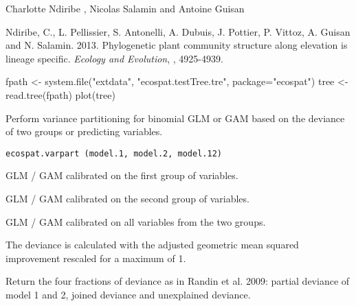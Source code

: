 \documentclass[a4paper]{book}
\begin{document}
%
\begin{Author}\relax
Charlotte Ndiribe , Nicolas Salamin  and Antoine Guisan 

\end{Author}
%
\begin{References}\relax
Ndiribe, C., L. Pellissier, S. Antonelli, A. Dubuis, J. Pottier, P. Vittoz, A. Guisan and N. Salamin. 2013. Phylogenetic plant community structure along elevation is lineage specific. \emph{Ecology and Evolution}, , 4925-4939.
\end{References}
%
\begin{Examples}
\begin{ExampleCode}
fpath <- system.file("extdata", "ecospat.testTree.tre", package="ecospat")
tree <- read.tree(fpath)
plot(tree)
\end{ExampleCode}
\end{Examples}
%
\begin{Description}\relax
Perform variance partitioning for binomial GLM or GAM based on the deviance of two groups or predicting variables.
\end{Description}
%
\begin{Usage}
\begin{verbatim}
ecospat.varpart (model.1, model.2, model.12)
\end{verbatim}
\end{Usage}
%
\begin{Arguments}
\begin{ldescription}
\item[\code{model.1}] GLM / GAM calibrated on the first group of variables.
\item[\code{model.2}] GLM / GAM calibrated on the second group of variables.
\item[\code{model.12}] GLM / GAM calibrated on all variables from the two groups.
\end{ldescription}
\end{Arguments}
%
\begin{Details}\relax
The deviance is calculated with the adjusted geometric mean squared improvement rescaled for a maximum of 1.
\end{Details}
%
\begin{Value}
Return the four fractions of deviance as in Randin et al. 2009: partial deviance of model 1 and 2, joined deviance and unexplained deviance.
\end{Value}
\end{document}
